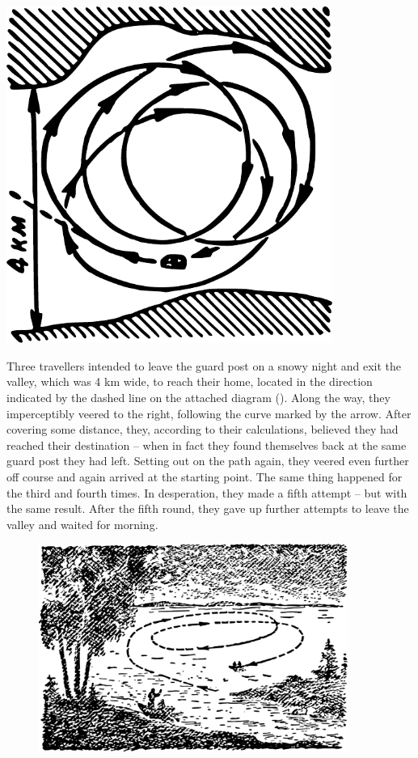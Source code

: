 \begin{marginfigure}%
\centering
\includegraphics[width=0.8\textwidth]{figures/ch-08/fig-113.pdf}
\end{marginfigure}


Three travellers intended to leave the guard post on a snowy night and exit the valley, which was 4 km wide, to reach their home, located in the direction indicated by the dashed line on the attached diagram (). Along the way, they imperceptibly veered to the right, following the curve marked by the arrow. After covering some distance, they, according to their calculations, believed they had reached their destination -- when in fact they found themselves back at the same guard post they had left. Setting out on the path again, they veered even further off course and again arrived at the starting point. The same thing happened for the third and fourth times. In desperation, they made a fifth attempt -- but with the same result. After the fifth round, they gave up further attempts to leave the valley and waited for morning.

\begin{figure}[h!]
\centering
\includegraphics[width=0.9\textwidth]{figures/ch-08/fig-114.pdf}
\end{figure}


